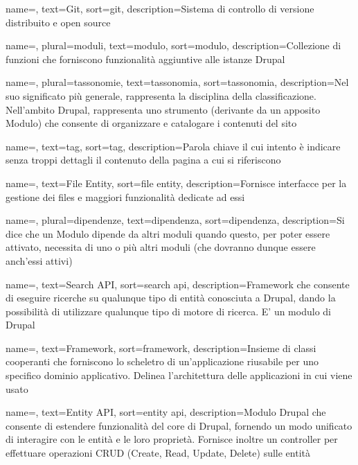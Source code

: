 {
	name=,
	text=Git,
	sort=git,
	description={Sistema di controllo di versione distribuito e \gls{open source}}
}

{
	name=,
	plural=moduli,
	text=modulo,
	sort=modulo,
	description={Collezione di funzioni che forniscono funzionalità aggiuntive alle istanze \gls{Drupal} }
}

{
	name=,
	plural=tassonomie,
	text=tassonomia,
	sort=tassonomia,
	description={Nel suo significato più generale, rappresenta la disciplina della classificazione. Nell'ambito \gls{Drupal}, rappresenta uno strumento (derivante da un apposito \gls{Modulo}) che consente di organizzare e catalogare i contenuti del sito}
}

{
	name=,
	text=tag,
	sort=tag,
	description={Parola chiave il cui intento è indicare senza troppi dettagli il contenuto della pagina a cui si riferiscono}
}

{
	name=,
	text=File Entity,
	sort=file entity,
	description={Fornisce interfacce per la gestione dei files e maggiori funzionalità dedicate ad essi}	
}

{
	name=,
	plural=dipendenze,
	text=dipendenza,
	sort=dipendenza,
	description={Si dice che un \gls{Modulo} dipende da altri moduli quando questo, per poter essere attivato, necessita di uno o più altri moduli (che dovranno dunque essere anch'essi attivi)}
}

{
	name=,
	text=Search API,
	sort=search api,
	description={\gls{Framework} che consente di eseguire ricerche su qualunque tipo di entità conosciuta a \gls{Drupal}, dando la possibilità di utilizzare qualunque tipo di motore di ricerca. E' un modulo di \gls{Drupal}}
}

{
	name=,
	text=Framework,
	sort=framework,
	description={Insieme di classi cooperanti che forniscono lo scheletro di un’applicazione riusabile per uno specifico dominio applicativo. Delinea l’architettura delle applicazioni in cui viene usato}
}

{
	name=,
	text=Entity API,
	sort=entity api,
	description={\gls{Modulo} \gls{Drupal} che consente di estendere funzionalità del core di \gls{Drupal}, fornendo un modo unificato di interagire con le entità e le loro proprietà. Fornisce inoltre un controller per effettuare operazioni CRUD (Create, Read, Update, Delete) sulle entità}
}

